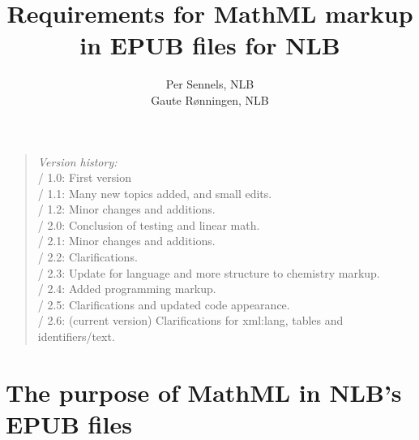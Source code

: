 \documentclass[english,a4paper,11pt]{article}
\title{Requirements for MathML markup\\ in EPUB files for NLB}
\author{Per Sennels, NLB\\Gaute Rønningen, NLB}
\begin{document}
	\bunntekst
	\thispagestyle{empty}
	\raggedright
	
	\maketitle
	\thispagestyle{empty}
	\vfill
	\begin{quote} {
		\bigskip
		\emph{Version history:}\\
		\textbullet{} / 1.0: First version\\
		\textbullet{} / 1.1: Many new topics added, and small edits.\\
		\textbullet{} / 1.2: Minor changes and additions.\\
		\textbullet{} / 2.0: Conclusion of testing and linear math.\\
        \textbullet{} / 2.1: Minor changes and additions.\\
        \textbullet{} / 2.2: Clarifications.\\
        \textbullet{} / 2.3: Update for language and more structure to chemistry markup.\\
        \textbullet{} / 2.4: Added programming markup.\\
        \textbullet{} / 2.5: Clarifications and updated code appearance.\\
        \textbullet{} / 2.6: (current version) Clarifications for xml:lang, tables and identifiers/text.\\
        \bigskip
	}
	\end{quote}
	\vfill
	\pagebreak
	\tableofcontents
	\vfill
	\pagebreak

\section{The purpose of MathML in NLB's EPUB files}
\end{document}
